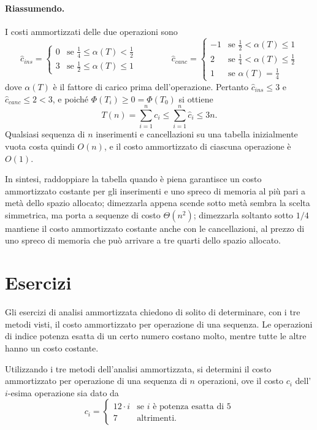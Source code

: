 \paragraph{Riassumendo.}
I costi ammortizzati delle due operazioni sono
\[
\hat{c}_{ins} = \begin{cases} 0 & \text{se } \frac{1}{4} \le \alpha(T) < \frac{1}{2} \\[1mm] 3 & \text{se } \frac{1}{2} \le \alpha(T) \le 1 \end{cases}
\qquad\qquad
\hat{c}_{canc} = \begin{cases} -1 & \text{se } \frac{1}{2} < \alpha(T) \le 1 \\[1mm] 2 & \text{se } \frac{1}{4} < \alpha(T) \le \frac{1}{2} \\[1mm] 1 & \text{se } \alpha(T) = \frac{1}{4} \end{cases}
\]
dove $\alpha(T)$ è il fattore di carico prima dell'operazione. Pertanto $\hat{c}_{ins} \le 3$ e $\hat{c}_{canc} \le 2 < 3$, e poiché $\Phi(T_i) \ge 0 = \Phi(T_0)$ si ottiene
\[
T(n) = \sum_{i=1}^{n} c_i \le \sum_{i=1}^{n} \hat{c}_i \le 3n.
\]
Qualsiasi sequenza di $n$ inserimenti e cancellazioni su una tabella inizialmente vuota costa quindi $O(n)$, e il costo ammortizzato di ciascuna operazione è $O(1)$.

In sintesi, raddoppiare la tabella quando è piena garantisce un costo ammortizzato costante per gli inserimenti e uno spreco di memoria al più pari a metà dello spazio allocato; dimezzarla appena scende sotto metà sembra la scelta simmetrica, ma porta a sequenze di costo $\Theta(n^2)$; dimezzarla soltanto sotto $1/4$ mantiene il costo ammortizzato costante anche con le cancellazioni, al prezzo di uno spreco di memoria che può arrivare a tre quarti dello spazio allocato.

\section{Esercizi}\label{sec:ammortizzata-esercizi}
Gli esercizi di analisi ammortizzata chiedono di solito di determinare, con i tre metodi visti, il costo ammortizzato per operazione di una sequenza. Le operazioni di indice potenza esatta di un certo numero costano molto, mentre tutte le altre hanno un costo costante.

\begin{esercizio}\label{es:ammortizzata-2023}
Utilizzando i tre metodi dell'analisi ammortizzata, si determini il costo ammortizzato per operazione di una sequenza di $n$ operazioni, ove il costo $c_i$ dell'$i$-esima operazione sia dato da
\[
c_i =
\begin{cases}
    12 \cdot i & \text{se } i \text{ è potenza esatta di } 5 \\
    7 & \text{altrimenti.}
\end{cases}
\]
\end{esercizio}

